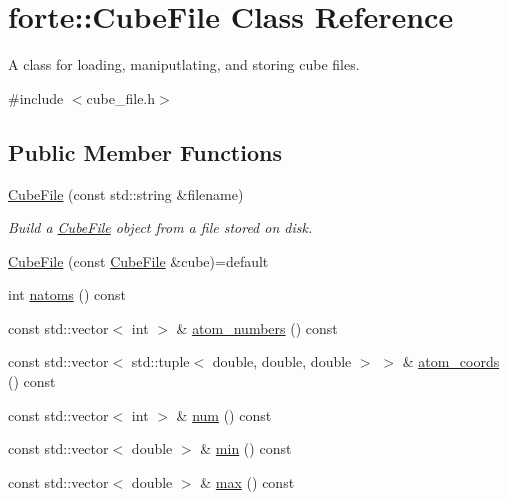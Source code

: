 \hypertarget{classforte_1_1_cube_file}{}\section{forte\+:\+:Cube\+File Class Reference}
\label{classforte_1_1_cube_file}


A class for loading, maniputlating, and storing cube files.  




{\ttfamily \#include $<$cube\+\_\+file.\+h$>$}

\subsection*{Public Member Functions}
\begin{DoxyCompactItemize}
\item 
\mbox{\hyperlink{classforte_1_1_cube_file_a5b182bf719f0668f4e4d59fef9140f36}{Cube\+File}} (const std\+::string \&filename)
\begin{DoxyCompactList}\small\item\em Build a \mbox{\hyperlink{classforte_1_1_cube_file}{Cube\+File}} object from a file stored on disk. \end{DoxyCompactList}\item 
\mbox{\hyperlink{classforte_1_1_cube_file_ac091f6918736c043fad6e108ec209b66}{Cube\+File}} (const \mbox{\hyperlink{classforte_1_1_cube_file}{Cube\+File}} \&cube)=default
\item 
int \mbox{\hyperlink{classforte_1_1_cube_file_a9ad38a5a7b190ddb0a5e162755cecf59}{natoms}} () const
\item 
const std\+::vector$<$ int $>$ \& \mbox{\hyperlink{classforte_1_1_cube_file_a2b6769f5f719e86ef637badec2b0cff1}{atom\+\_\+numbers}} () const
\item 
const std\+::vector$<$ std\+::tuple$<$ double, double, double $>$ $>$ \& \mbox{\hyperlink{classforte_1_1_cube_file_aa443cf8e4c16f88cea31d5082c73b83d}{atom\+\_\+coords}} () const
\item 
const std\+::vector$<$ int $>$ \& \mbox{\hyperlink{classforte_1_1_cube_file_a0f2d624536eb4ecdca77092e0ac39ff8}{num}} () const
\item 
const std\+::vector$<$ double $>$ \& \mbox{\hyperlink{classforte_1_1_cube_file_a4d045a770876626dc7d34ebc39ca0525}{min}} () const
\item 
const std\+::vector$<$ double $>$ \& \mbox{\hyperlink{classforte_1_1_cube_file_ac09285b9257b4a4c4fcf7f1d304ae953}{max}} () const

\end{DoxyCompactItemize}
